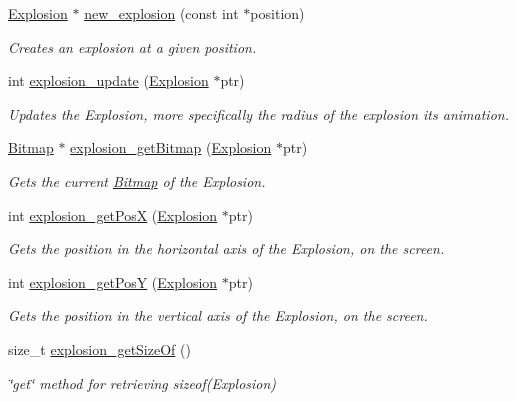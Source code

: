 \begin{DoxyCompactItemize}
\hyperlink{group___missile_gab15157e0eccd9297f66644015d4966b1}{Explosion} $\ast$ \hyperlink{group___missile_ga26a5cb6dc4144b31bb2005e4b587ff4f}{new\+\_\+explosion} (const int $\ast$position)
\begin{DoxyCompactList}\small\item\em Creates an explosion at a given position. \end{DoxyCompactList}\item 
int \hyperlink{group___missile_gabc0219cffe0a8c0060dabb7dfab4dbc3}{explosion\+\_\+update} (\hyperlink{group___missile_gab15157e0eccd9297f66644015d4966b1}{Explosion} $\ast$ptr)
\begin{DoxyCompactList}\small\item\em Updates the Explosion, more specifically the radius of the explosion its animation. \end{DoxyCompactList}\item 
\hyperlink{struct_bitmap}{Bitmap} $\ast$ \hyperlink{group___missile_ga1f8e365295b2facc195f17155bba6b71}{explosion\+\_\+get\+Bitmap} (\hyperlink{group___missile_gab15157e0eccd9297f66644015d4966b1}{Explosion} $\ast$ptr)
\begin{DoxyCompactList}\small\item\em Gets the current \hyperlink{struct_bitmap}{Bitmap} of the Explosion. \end{DoxyCompactList}\item 
int \hyperlink{group___missile_gaaa4dd8460fa2eeb803f0e62b0b693589}{explosion\+\_\+get\+PosX} (\hyperlink{group___missile_gab15157e0eccd9297f66644015d4966b1}{Explosion} $\ast$ptr)
\begin{DoxyCompactList}\small\item\em Gets the position in the horizontal axis of the Explosion, on the screen. \end{DoxyCompactList}\item 
int \hyperlink{group___missile_gab7f446e98be5f55752942865f5e10be4}{explosion\+\_\+get\+PosY} (\hyperlink{group___missile_gab15157e0eccd9297f66644015d4966b1}{Explosion} $\ast$ptr)
\begin{DoxyCompactList}\small\item\em Gets the position in the vertical axis of the Explosion, on the screen. \end{DoxyCompactList}\item 
size\+\_\+t \hyperlink{group___missile_ga41c747ea318363b16bce9e8bb8ea19ec}{explosion\+\_\+get\+Size\+Of} ()
\begin{DoxyCompactList}\small\item\em \char`\"{}get\char`\"{} method for retrieving sizeof(\+Explosion) \end{DoxyCompactList}\item 

\end{DoxyCompactItemize}
